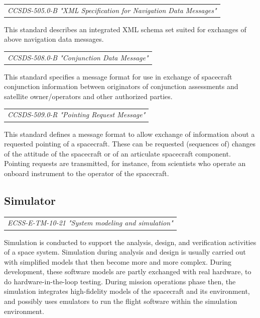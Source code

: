 \begin{tabular}{l}
\textit{CCSDS-505.0-B "XML Specification for Navigation Data Messages" \cite{CCSDS-505.0-B}} \\
\end{tabular}

This standard describes an integrated XML schema set suited for exchanges of above navigation data messages. 

\begin{tabular}{l}
\textit{CCSDS-508.0-B "Conjunction Data Message" \cite{CCSDS-508.0-B}} \\
\end{tabular}

This standard specifies a message format for use in exchange of spacecraft conjunction information between originators of conjunction assessments and satellite owner/operators and other authorized parties. 

\begin{tabular}{l}
\textit{CCSDS-509.0-R "Pointing Request Message" \cite{CCSDS-509.0-R}} \\
\end{tabular}

This standard defines a message format to allow exchange of information about a requested pointing of a spacecraft. These can be requested (sequences of) changes of the attitude of the spacecraft or of an articulate spacecraft component. Pointing requests are transmitted, for instance, from scientists who operate an onboard instrument to the operator of the  spacecraft.
  
\subsection{Simulator}

\begin{tabular}{l}
\textit{ECSS-E-TM-10-21 "System modeling and simulation" \cite{ECSS-E-TM-10-21}} \\
\end{tabular}

Simulation is conducted to support the analysis, design, and verification activities of a space system. Simulation during analysis and design is usually carried out with simplified models that then become more and more complex. During development, these software models are partly exchanged with real hardware, to do hardware-in-the-loop testing. During mission operations phase then, the simulation integrates high-fidelity models of the spacecraft and its environment, and possibly uses emulators to run the flight software within the simulation environment.

